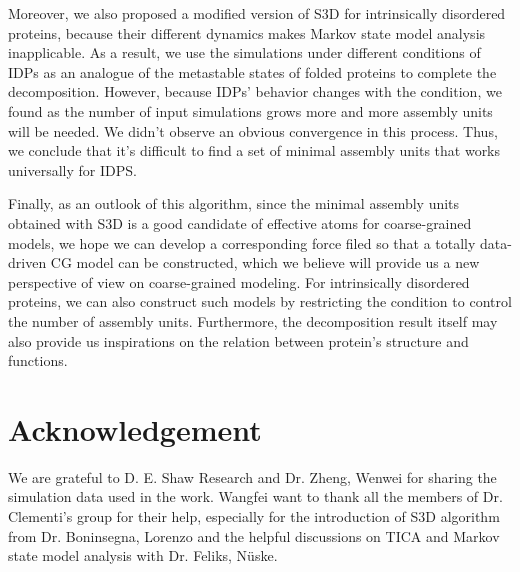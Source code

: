 \documentclass[12pt]{article}
\newcounter{lastnote}
\begin{document}
Moreover, we also proposed a modified version of S3D for intrinsically disordered proteins, because their different dynamics makes Markov state model analysis inapplicable. As a result, we use the simulations under different conditions of IDPs as an analogue of the metastable states of folded proteins to complete the decomposition. However, because IDPs' behavior changes with the condition, we found as the number of input simulations grows more and more assembly units will be needed. We didn't observe an obvious convergence in this process. Thus, we conclude that it's difficult to find a set of minimal assembly units that works universally for IDPS.

Finally, as an outlook of this algorithm, since the minimal assembly units obtained with S3D is a good candidate of effective atoms for coarse-grained models, we hope we can develop a corresponding force filed so that a totally data-driven CG model can be constructed, which we believe will provide us a new perspective of view on coarse-grained modeling. For intrinsically disordered proteins, we can also construct such models by restricting the condition to control the number of assembly units. Furthermore, the decomposition result itself may also provide us inspirations on the relation between protein's structure and functions.

\section*{Acknowledgement}

We are grateful to D. E. Shaw Research and Dr. Zheng, Wenwei for sharing the simulation data used in the work. Wangfei want to thank all the members of Dr. Clementi's group for their help, especially for the introduction of S3D algorithm from Dr. Boninsegna, Lorenzo and the helpful discussions on TICA and Markov state model analysis with Dr. Feliks, Nüske. 

\clearpage






\end{document}
